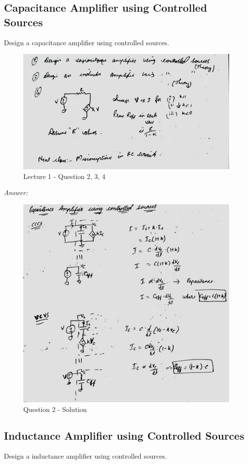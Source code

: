\documentclass[a4paper]{article}
\begin{document}
\subsection{Capacitance Amplifier using Controlled Sources}
Design a capacitance amplifier using controlled sources.\\
\begin{figure}
    \centering
    \includegraphics[width=0.8\linewidth]{images/Lec_1_Q_2_3_4.jpeg}
    \caption{Lecture 1 - Question 2, 3, 4}
\end{figure}
\textit{Answer: }\\
\begin{figure}
    \centering
    \includegraphics[width=1\linewidth]{images/Lec_1_Q2_Soln.jpeg}
    \caption{Question 2 - Solution}
\end{figure}
\subsection{Inductance Amplifier using Controlled Sources}
Design a inductance amplifier using controlled sources.\\
\end{document}
